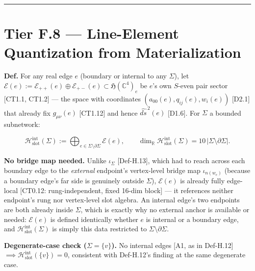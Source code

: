 \begin{theorem}
\vspace{2pt}\noindent\rule{\textwidth}{0.4pt}\vspace{2pt}

\end{theorem}

\section[Tier F.8 — Line-Element Quantization from Materialization]{\texorpdfstring{Tier F.8 — Line-Element Quantization from Materialization}{Tier F.8 - Line-Element Quantization from Materialization}}

\begin{definition}\label{tag:Def-H-14}
\textbf{Def.} For any real edge $e$ (boundary or internal to any $\Sigma$), let $\mathcal E(e):=\mathcal E_{++}(e)\oplus\mathcal E_{+-}(e)\subset\mathfrak H(\mathbb C^4)_e$ be $e$'s own $S$-even pair sector [CT1.1, CT1.2] — the space with coordinates $(a_{00}(e),q_{ij}(e),w_i(e))$ [D2.1] that already fix $g_{\mu\nu}(e)$ [CT1.12] and hence $\widehat{ds}^{\,2}(e)$ [D1.6]. For $\Sigma$ a bounded subnetwork:

\[
\mathcal H_{\mathrm{slot}}^{\mathrm{int}}(\Sigma):=\bigoplus_{e\in\Sigma\setminus\partial\Sigma}\mathcal E(e),\qquad\dim_{\mathbb R}\mathcal H_{\mathrm{slot}}^{\mathrm{int}}(\Sigma)=10\,|\Sigma\setminus\partial\Sigma|.
\]

\textbf{No bridge map needed.} Unlike $\iota_\Sigma$ [Def-H.13], which had to reach across each boundary edge to the \textit{external} endpoint's vertex-level bridge map $\iota_{n(w_e)}$ (because a boundary edge's far side is genuinely outside $\Sigma$), $\mathcal E(e)$ is already fully edge-local [CT0.12: rung-independent, fixed 16-dim block] — it references neither endpoint's rung nor vertex-level slot algebra. An internal edge's two endpoints are both already inside $\Sigma$, which is exactly why no external anchor is available or needed: $\mathcal E(e)$ is defined identically whether $e$ is internal or a boundary edge, and $\mathcal H_{\mathrm{slot}}^{\mathrm{int}}(\Sigma)$ is simply this data restricted to $\Sigma\setminus\partial\Sigma$.

\textbf{Degenerate-case check ($\Sigma=\{v\}$).} No internal edges [A1, as in Def-H.12] $\implies\mathcal H_{\mathrm{slot}}^{\mathrm{int}}(\{v\})=0$, consistent with Def-H.12's finding at the same degenerate case.


\end{definition}
